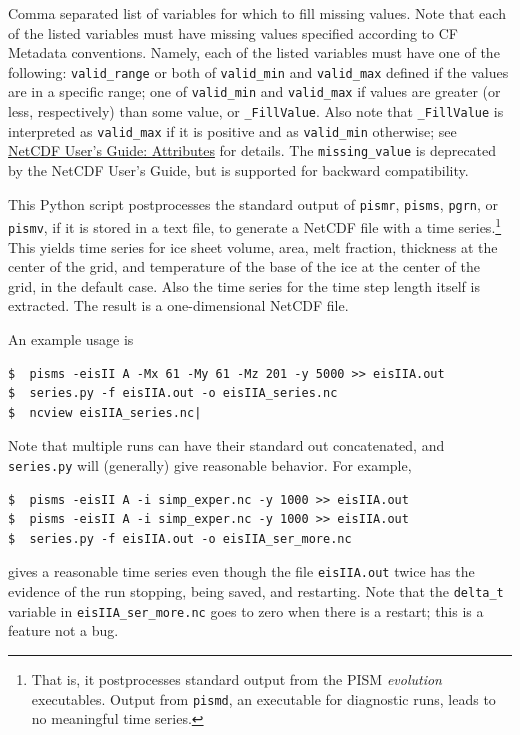 \documentclass[11pt,final]{amsart}
\begin{document}
  Comma separated list of variables for which to fill missing values.  Note that each of the listed variables must have missing values specified according to CF Metadata conventions. Namely, each of the listed variables must have one of the following: \verb|valid_range| or both of \verb|valid_min| and \verb|valid_max| defined if the values are in a specific range; one of \verb|valid_min| and \verb|valid_max| if values are greater (or less, respectively) than some value, or \verb|_FillValue|. Also note that \verb|_FillValue| is interpreted as \verb|valid_max| if it is positive and as \verb|valid_min| otherwise; see \href{http://www.unidata.ucar.edu/software/netcdf/guide_10.html#SEC76}{NetCDF User's Guide: Attributes} for details. The \verb|missing_value| is deprecated by the NetCDF User's Guide, but is supported for backward compatibility.


  This Python script postprocesses the standard output of \verb|pismr|, \verb|pisms|, \verb|pgrn|, or \verb|pismv|, if it is stored in a text file, to generate a NetCDF file with a time series.\footnote{That is, it postprocesses standard output from the PISM \emph{evolution} executables.  Output from \texttt{pismd}, an executable for diagnostic runs, leads to no meaningful time series.}  This yields time series for ice sheet volume, area, melt fraction, thickness at the center of the grid, and temperature of the base of the ice at the center of the grid, in the default case.  Also the time series for the time step length itself is extracted.  The result is a one-dimensional NetCDF file.

An example usage is

\begin{verbatim}
$  pisms -eisII A -Mx 61 -My 61 -Mz 201 -y 5000 >> eisIIA.out
$  series.py -f eisIIA.out -o eisIIA_series.nc
$  ncview eisIIA_series.nc|
\end{verbatim}
Note that multiple runs can have their standard out concatenated, and \verb|series.py| will (generally) give reasonable behavior.  For example,

\begin{verbatim}
$  pisms -eisII A -i simp_exper.nc -y 1000 >> eisIIA.out
$  pisms -eisII A -i simp_exper.nc -y 1000 >> eisIIA.out
$  series.py -f eisIIA.out -o eisIIA_ser_more.nc
\end{verbatim}
gives a reasonable time series even though the file \verb|eisIIA.out| twice has the evidence of the run stopping, being saved, and restarting.  Note that the \verb|delta_t| variable in \verb|eisIIA_ser_more.nc| goes to zero when there is a restart; this is a feature not a bug.
\end{document}
